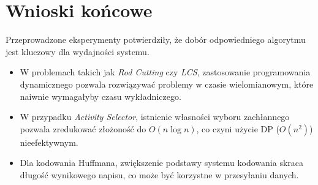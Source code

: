 \documentclass{article}
\begin{document}
	\section{Wnioski końcowe}
	Przeprowadzone eksperymenty potwierdziły, że dobór odpowiedniego algorytmu jest kluczowy dla wydajności systemu.
	\begin{itemize}
		\item W problemach takich jak \textit{Rod Cutting} czy \textit{LCS}, zastosowanie programowania dynamicznego pozwala rozwiązywać problemy w czasie wielomianowym, które naiwnie wymagałyby czasu wykładniczego.
		\item W przypadku \textit{Activity Selector}, istnienie własności wyboru zachłannego pozwala zredukować złożoność do $O(n \log n)$, co czyni użycie DP ($O(n^2)$) nieefektywnym.
		\item Dla kodowania Huffmana, zwiększenie podstawy systemu kodowania skraca długość wynikowego napisu, co może być korzystne w przesyłaniu danych.
	\end{itemize}
	
\end{document}
